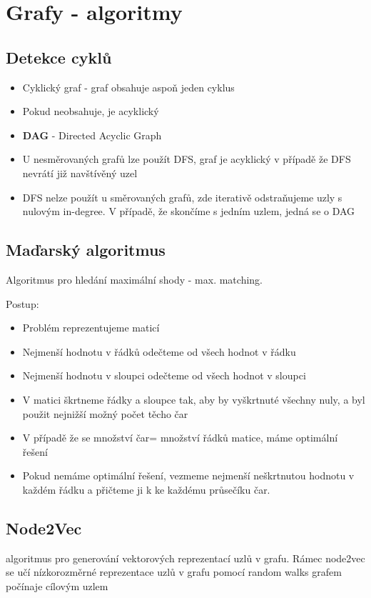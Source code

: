 \section{Grafy - algoritmy}
\subsection{Detekce cyklů}
\begin{itemize}
    \item Cyklický graf - graf obsahuje aspoň jeden cyklus
    \item Pokud neobsahuje, je acyklický
    \item \textbf{DAG} - Directed Acyclic Graph
    \item U nesměrovaných grafů lze použít DFS, graf je acyklický v případě že DFS nevrátí již navštívěný uzel
    \item DFS nelze použít u směrovaných grafů, zde iterativě odstraňujeme uzly s nulovým in-degree. V případě, že skončíme s jedním uzlem, jedná se o DAG
\end{itemize}
\subsection{Maďarský algoritmus}
Algoritmus pro hledání maximální shody - max. matching.

Postup:
\begin{itemize}
    \item Problém reprezentujeme maticí
    \item Nejmenší hodnotu v řádků odečteme od všech hodnot v řádku
    \item Nejmenší hodnotu v sloupci odečteme od všech hodnot v sloupci
    \item V matici škrtneme řádky a sloupce tak, aby by vyškrtnuté všechny nuly, a byl použit nejnižší možný počet těcho čar
    \item V případě že se množství čar= množství řádků matice, máme optimální řešení
    \item Pokud nemáme optimální řešení, vezmeme nejmenší neškrtnutou hodnotu v každém řádku a přičteme ji k ke každému průsečíku čar.
    
\end{itemize}
\subsection{Node2Vec}
algoritmus pro generování vektorových reprezentací uzlů v grafu. Rámec node2vec se učí nízkorozměrné reprezentace uzlů v grafu pomocí random walks grafem počínaje cílovým uzlem
